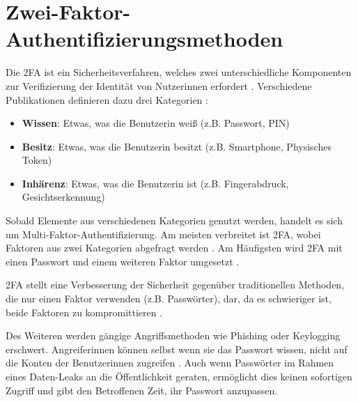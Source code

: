 \chapter{Zwei-Faktor-Authentifizierungsmethoden}

Die \acf{2FA} ist ein Sicherheitsverfahren, welches zwei unterschiedliche Komponenten zur Verifizierung der Identität von Nutzerinnen erfordert \parencite{decristofaroComparativeUsability2014}. Verschiedene Publikationen definieren dazu drei Kategorien \parencite{decristofaroComparativeUsability2014, yuEfficientGeneric2014, singhMultifactorAuthentication2017}:
\begin{itemize}
  \item \textbf{Wissen}: Etwas, was die Benutzerin weiß (z.B. Passwort, PIN)
  \item \textbf{Besitz}: Etwas, was die Benutzerin besitzt (z.B. Smartphone, Physisches Token)
  \item \textbf{Inhärenz}: Etwas, was die Benutzerin ist (z.B. Fingerabdruck, Gesichtserkennung)
\end{itemize}
Sobald Elemente aus verschiedenen Kategorien genutzt werden, handelt es sich um Multi-Faktor-Authentifizierung. Am meisten verbreitet ist \ac{2FA}, wobei Faktoren aus zwei Kategorien abgefragt werden \parencite{decristofaroComparativeUsability2014}. Am Häufigsten wird \ac{2FA} mit einen Passwort und einem weiteren Faktor umgesetzt \parencite{decristofaroComparativeUsability2014}.

\pskip
\ac{2FA} stellt eine Verbesserung der Sicherheit gegenüber traditionellen Methoden, die nur einen Faktor verwenden (z.B. Passwörter), dar, da es schwieriger ist, beide Faktoren zu kompromittieren \parencite{dasguptaMultiFactorAuthentication2017}.

Des Weiteren werden gängige Angriffsmethoden wie Phishing oder Keylogging erschwert. Angreiferinnen können selbst wenn sie das Passwort wissen, nicht auf die Konten der Benutzerinnen zugreifen \parencite{dasguptaMultiFactorAuthentication2017}. Auch wenn Passwörter im Rahmen eines Daten-Leaks an die Öffentlichkeit geraten, ermöglicht dies keinen sofortigen Zugriff und gibt den Betroffenen Zeit, ihr Passwort anzupassen.

